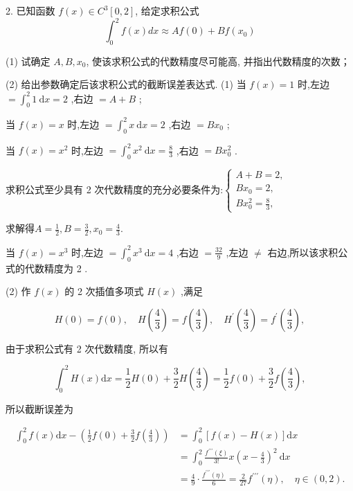   \begin{tcolorbox}[breakable,enhanced,arc=0mm,outer arc=0mm,
		boxrule=0pt,toprule=1pt,leftrule=0pt,bottomrule=1pt, rightrule=0pt,left=0.2cm,right=0.2cm,
		titlerule=0.5em,toptitle=0.1cm,bottomtitle=-0.1cm,top=0.2cm,
		colframe=white!10!biru,colback=white!90!biru,coltitle=white,
            coltext=black,title =2024-05, title style={white!10!biru}, before skip=8pt, after skip=8pt,before upper=\hspace{2em},
		fonttitle=\bfseries,fontupper=\normalsize]

2. 已知函数 $ f(x) \in C^{3}[0,2] $, 给定求积公式
$$
\int_{0}^{2} f(x) d x \approx A f(0)+B f\left(x_{0}\right)
$$

(1) 试确定 $ A, B, x_{0} $, 使该求积公式的代数精度尽可能高, 并指出代数精度的次数；

(2) 给出参数确定后该求积公式的截断误差表达式.
\tcblower
 (1) 当 $f(x) = 1$ 时,左边 $ = {\int}_{0}^{2}1\mathrm{\ d}x = 2$ ,右边 $ = A + B$ ;

当 $f(x) = x$ 时,左边 $ = {\int}_{0}^{2}x\mathrm{\ d}x = 2$ ,右边 $ = Bx_{0}$ ;

当 $f(x) = x^{2}$ 时,左边 $ = {\int}_{0}^{2}x^{2}\mathrm{\ d}x = \frac{8}{3}$ ,右边 $ = Bx_{0}^{2}$ .

求积公式至少具有 2 次代数精度的充分必要条件为:$\left\{\begin{array}{l} A + B = 2, \\ Bx_{0} = 2, \\ Bx_{0}^{2} = \frac{8}{3}, \end{array} \right.$

求解得$A = \frac{1}{2},B = \frac{3}{2},x_{0} = \frac{4}{3}.$

当 $f(x) = x^{3}$ 时,左边 $ = {\int}_{0}^{2}x^{3}\mathrm{\ d}x = 4$ ,右边 $ = \frac{32}{9}$ ,左边 $ {\neq} $ 右边,所以该求积公 式的代数精度为 2 .

(2) 作 $f(x)$ 的 2 次插值多项式 $H(x)$ ,满足

$$H(0) = f(0),\quad H\left( \frac{4}{3} \right) = f\left( \frac{4}{3} \right),\quad H^{{\prime}}\left( \frac{4}{3} \right) = f^{{\prime}}\left( \frac{4}{3} \right),$$

由于求积公式有 2 次代数精度, 所以有

$${\int}_{0}^{2}H(x)\mathrm{d}x = \frac{1}{2}H(0) + \frac{3}{2}H\left( \frac{4}{3} \right) = \frac{1}{2}f(0) + \frac{3}{2}f\left( \frac{4}{3} \right),$$

所以截断误差为

$$\begin{aligned}
    {\int}_{0}^{2}f(x)\mathrm{d}x {-} \left( \frac{1}{2}f(0) + \frac{3}{2}f\left( \frac{4}{3} \right) \right) &= {\int}_{0}^{2}\left\lbrack f(x) {-} H(x) \right\rbrack\mathrm{d}x\\ &= {\int}_{0}^{2}\frac{f^{{\prime}{\prime}{\prime}}(\xi)}{3!}x{\left( x {-} \frac{4}{3} \right)}^{2}\mathrm{\ d}x\\&= \frac{4}{9} {\cdot} \frac{f^{{\prime}{\prime}{\prime}}(\eta)}{6} = \frac{2}{27}f^{{\prime}{\prime}{\prime}}(\eta),\quad\eta {\in} (0,2).
\end{aligned}$$

\end{tcolorbox}

